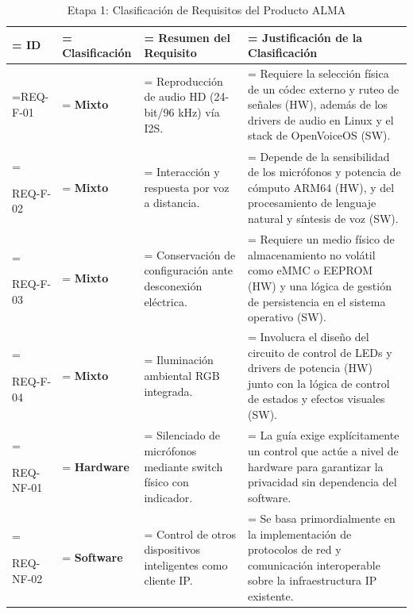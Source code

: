 \documentclass[%
	paper=a4,
	twoside=false,
	parskip=half,
	chapterprefix=false,
	10pt,
	headings=normal,
	bibliography=totoc,
	listof=totoc,
	titlepage=on,
	captions=tableabove,
	draft=false,
]{scrbook}%
\begin{document}
\begin{table}[H]
    \caption{Etapa 1: Clasificación de Requisitos del Producto ALMA}
    \centering
    \renewcommand{\arraystretch}{1.5}
    \begin{tabularx}{\textwidth}{|>{\hsize=0.12\hsize\linewidth=\hsize}X|
                                   >{\hsize=0.18\hsize\linewidth=\hsize}X|
                                   >{\hsize=0.35\hsize\linewidth=\hsize}X|
                                   >{\hsize=0.35\hsize\linewidth=\hsize}X|}
        \hline
        \rowcolor[HTML]{EFEFEF}
        \textbf{ID} & \textbf{Clasificación} & \textbf{Resumen del Requisito} & \textbf{Justificación de la Clasificación} \\ \hline

        REQ-F-01 & \textbf{Mixto} & Reproducción de audio HD (24-bit/96 kHz) vía I2S. & Requiere la selección física de un códec externo y ruteo de señales (HW), además de los drivers de audio en Linux y el stack de OpenVoiceOS (SW). \\ \hline

        REQ-F-02 & \textbf{Mixto} & Interacción y respuesta por voz a distancia. & Depende de la sensibilidad de los micrófonos y potencia de cómputo ARM64 (HW), y del procesamiento de lenguaje natural y síntesis de voz (SW). \\ \hline

        REQ-F-03 & \textbf{Mixto} & Conservación de configuración ante desconexión eléctrica. & Requiere un medio físico de almacenamiento no volátil como eMMC o EEPROM (HW) y una lógica de gestión de persistencia en el sistema operativo (SW). \\ \hline

        REQ-F-04 & \textbf{Mixto} & Iluminación ambiental RGB integrada. & Involucra el diseño del circuito de control de LEDs y drivers de potencia (HW) junto con la lógica de control de estados y efectos visuales (SW). \\ \hline

        REQ-NF-01 & \textbf{Hardware} & Silenciado de micrófonos mediante switch físico con indicador. & La guía exige explícitamente un control que actúe a nivel de hardware para garantizar la privacidad sin dependencia del software. \\ \hline

        REQ-NF-02 & \textbf{Software} & Control de otros dispositivos inteligentes como cliente IP. & Se basa primordialmente en la implementación de protocolos de red y comunicación interoperable sobre la infraestructura IP existente. \\ \hline


\end{tabularx}
\end{table}
\end{document}
